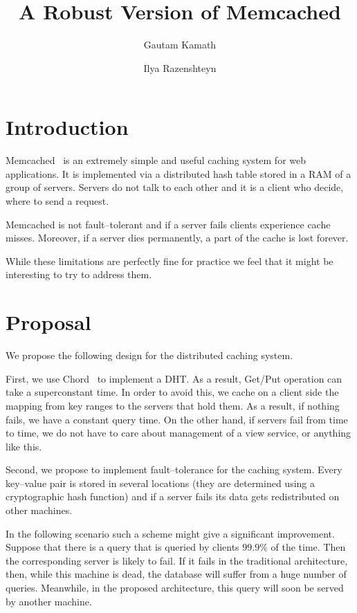 \documentclass[letterpaper,11pt]{article}
\begin{document}
    \title{A Robust Version of Memcached}
    \author{Gautam Kamath \and Ilya Razenshteyn}
    \maketitle

    \section{Introduction}

    Memcached~\cite{memcached} is an extremely simple and useful caching system for web applications. It is implemented
    via a distributed hash table stored in a RAM of a group of servers.
    Servers do not talk to each other and it is
    a client who decide, where to send a request.

    Memcached is not fault--tolerant and if a server fails clients experience cache misses. Moreover, if a server
    dies permanently, a part of the cache is lost forever.

    While these limitations are perfectly fine for practice we feel that it might be interesting
    to try to address them.

    \section{Proposal}

    We propose the following design for the distributed caching system.

    First, we use Chord~\cite{chord} to implement a DHT.
    As a result, Get/Put operation can take a superconstant time. In order to avoid this, we cache on a client 
    side the mapping from key ranges to the servers that hold them. As a result, if nothing fails, we have a
    constant query time. On the other hand, if servers fail from time to time,
    we do not have to care about management of a view service, or anything like this.

    Second, we propose to implement fault--tolerance for the caching system. Every key--value pair is stored in
    several locations (they are determined using a cryptographic hash function) and if a server fails its data
    gets redistributed on other machines.

    In the following scenario such a scheme might give a significant improvement. Suppose that there is a query
    that is queried by clients $99.9\%$ of the time. Then the corresponding server is likely to fail. If it fails
    in the traditional architecture, then, while this machine is dead, the database will suffer from a huge
    number of queries. Meanwhile, in the proposed architecture, this query will soon be served by another machine.
    


\end{document}
